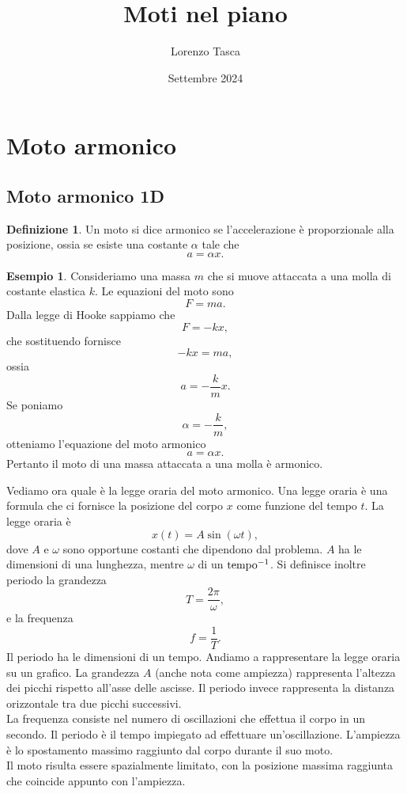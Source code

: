 \documentclass{article}
\title{Moti nel piano}
\author{Lorenzo Tasca}
\date{Settembre 2024}
\theoremstyle{definition}
\newtheorem*{definition}{Definizione}
\newtheorem*{example}{Esempio}
\begin{document}
\maketitle

\section{Moto armonico}
\subsection{Moto armonico 1D}
\begin{definition}
Un moto si dice armonico se l'accelerazione è proporzionale alla posizione, ossia se esiste una costante $\alpha$ tale che $$a=\alpha x.$$
\end{definition}
\begin{example}
Consideriamo una massa $m$ che si muove attaccata a una molla di costante elastica $k$. Le equazioni del moto sono $$F=ma.$$ Dalla legge di Hooke sappiamo che $$F=-kx,$$ che sostituendo fornisce $$-kx=ma,$$ ossia $$a=-\frac{k}{m}x.$$ Se poniamo $$\alpha=-\frac{k}{m},$$ otteniamo l'equazione del moto armonico $$a=\alpha x.$$ Pertanto il moto di una massa attaccata a una molla è armonico.
\end{example}
Vediamo ora quale è la legge oraria del moto armonico. Una legge oraria è una formula che ci fornisce la posizione del corpo $x$ come funzione del tempo $t$. La legge oraria è $$x(t)=A\sin(\omega t),$$ dove $A$ e $\omega$ sono opportune costanti che dipendono dal problema. $A$ ha le dimensioni di una lunghezza, mentre $\omega$ di un $\textup{tempo}^{-1}$. Si definisce inoltre periodo la grandezza $$T=\frac{2\pi}{\omega},$$ e la frequenza $$f=\frac{1}{T}.$$ Il periodo ha le dimensioni di un tempo. Andiamo a rappresentare la legge oraria su un grafico. 
La grandezza $A$ (anche nota come ampiezza) rappresenta l'altezza dei picchi rispetto all'asse delle ascisse. Il periodo invece rappresenta la distanza orizzontale tra due picchi successivi.\\ La frequenza consiste nel numero di oscillazioni che effettua il corpo in un secondo. Il periodo è il tempo impiegato ad effettuare un'oscillazione. L'ampiezza è lo spostamento massimo raggiunto dal corpo durante il suo moto. \\Il moto risulta essere spazialmente limitato, con la posizione massima raggiunta che coincide appunto con l'ampiezza.  
\end{document}

